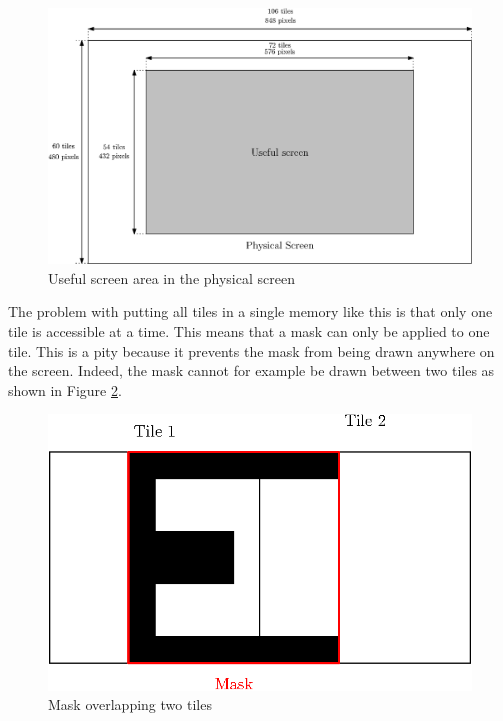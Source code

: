 \begin{figure}[H]
    \centering
    \includegraphics[width=\linewidth]{Chapter4-GPU_CLKU/res/screen_size}
    \caption{Useful screen area in the physical screen}
    \label{fig:gpu/screen_size}
\end{figure}

The problem with putting all tiles in a single memory like this is that only one tile is accessible 
at a time. This means that a mask can only be applied to one tile. This is a pity because it 
prevents the mask from being drawn anywhere on the screen. Indeed, the mask cannot for example be 
drawn between two tiles as shown in Figure \ref{fig:gpu/mask_2tiles}.

\begin{figure}[H]
    \centering
    \includegraphics[scale=1.0]{Chapter4-GPU_CLKU/res/mask_2tiles}
    \caption{Mask overlapping two tiles}
    \label{fig:gpu/mask_2tiles}
\end{figure}

